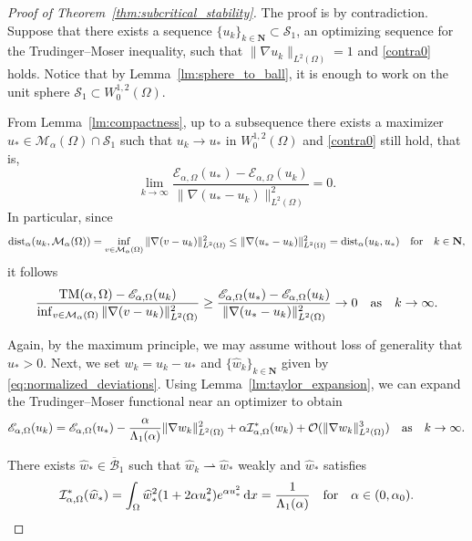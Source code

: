 \documentclass[reqno,11pt]{amsart}
\theoremstyle{definition}
\newcommand{\ud}{\,\mathrm{d}}
\begin{document}
    \begin{proof}[Proof of Theorem~\ref{thm:subcritical_stability}]
        The proof is by contradiction. 
        Suppose that there exists a sequence $\{u_k\}_{k\in\mathbf{N}} \subset \mathcal{S}_1$, an optimizing sequence for the Trudinger--Moser inequality, such that $\|\nabla u_k\|_{L^2(\Omega)}= 1$ and \eqref{contra0} holds.
        Notice that by Lemma~\ref{lm:sphere_to_ball}, it is enough to work on the unit sphere $\mathcal{S}_1\subset W^{1,2}_0(\Omega)$.
    
	From Lemma~\ref{lm:compactness}, up to a subsequence there exists a maximizer $u_*\in \mathcal{M}_\alpha(\Omega)\cap \mathcal{S}_1$ such that $u_k \rightarrow u_*$ in $W^{1,2}_0(\Omega)$ and \eqref{contra0} still hold, that is,
    \[
    \lim_{k\rightarrow \infty}\frac{ \mathscr{E}_{\alpha,\Omega}(u_*) - \mathscr{E}_{\alpha,\Omega}(u_k)}{\|{\nabla (u_*-u_k)}\|_{L^2(\Omega)}^2}=0.
    \]
    In particular, since 
    \[{\rm dist}_\alpha(u_k,\mathcal{M}_\alpha(\Omega))=\inf_{v \in \mathcal{M}_\alpha(\Omega)} \|{\nabla (v-u_k)}\|_{L^2(\Omega)}^2 \leq\|{\nabla (u_*-u_k)}\|_{L^2(\Omega)}^2={\rm dist}_\alpha(u_k,u_*) \quad {\rm for} \quad k\in \mathbf{N},\]
    it follows
	\[
	\frac{ {\rm TM}(\alpha,\Omega) - \mathscr{E}_{\alpha,\Omega}(u_k)}{ \inf_{v \in \mathcal{M}_\alpha(\Omega)} \|{\nabla (v-u_k)}\|_{L^2(\Omega)}^2}\geq \frac{\mathscr{E}_{\alpha,\Omega}(u_*) - \mathscr{E}_{\alpha,\Omega}(u_k)}{\|{\nabla (u_*-u_k  )}\|_{L^2(\Omega)}^2}\rightarrow 0 \quad {\rm as} \quad k\rightarrow\infty.
	\]
	
	Again, by the maximum principle, we may assume without loss of generality that $u_*>0$. Next, we set $w_k=u_k-u_*$ and $\{\widehat{w}_k\}_{k\in\mathbf{N}}$ given by \eqref{eq:normalized_deviations}.
    Using Lemma~\ref{lm:taylor_expansion}, we can expand the Trudinger--Moser functional near an optimizer to obtain 
	\begin{equation} \label{final_estimate1}  
		\mathscr{E}_{\alpha,\Omega} (u_k) =  \mathscr{E}_{\alpha,\Omega}(u_*) - \frac{\alpha}{\Lambda_1(\alpha)}
		\| \nabla w_k\|_{L^2(\Omega)}^2 + \alpha \mathcal{I}_{\alpha,\Omega}^*(w_k) + \mathcal{O}(\|\nabla w_k\|_{L^2(\Omega)}^3) \quad {\rm as} \quad k\to \infty.
	\end{equation} 
   
     There exists $\widehat{w}_*\in \overline{\mathcal{B}}_1$ such that $\widehat{w}_k\rightharpoonup \widehat{w}_*$ weakly and $\widehat{w}_*$ satisfies 
    \[
    \mathcal{I}_{\alpha,\Omega}^*(\widehat{w}_*)=\int_\Omega \widehat{w}_*^2(1+2\alpha u_*^2)e^{\alpha u_*^2} \ud x=\frac{1}{\Lambda_1(\alpha)} \quad {\rm for} \quad \alpha\in (0,\alpha_0).
    \]


\end{proof}
\end{document}

